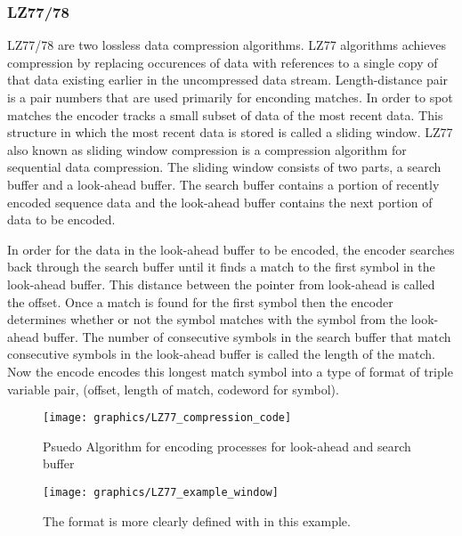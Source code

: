 \documentclass[letterpaper, 12pt]{article}
\begin{document}
\subsubsection{LZ77/78}
LZ77/78 are two lossless data compression algorithms. LZ77 algorithms achieves compression by replacing
occurences of data with references to a single copy of that data existing earlier in the uncompressed
data stream. Length-distance pair is a pair numbers that are used primarily for enconding matches. In order
to spot matches the encoder tracks a small subset of data of the most recent data. This structure in which
the most recent data is stored is called a sliding window. LZ77 also known as sliding window compression is
a compression algorithm for sequential data compression. The sliding window consists of two parts, a search
buffer and a look-ahead buffer. The search buffer contains a portion of recently encoded sequence data and
the look-ahead buffer contains the next portion of data to be encoded.
\par\vspace{\baselineskip}
In order for the data in the look-ahead buffer to be encoded, the encoder searches back through the
search buffer until it finds a match to the first symbol in the look-ahead buffer. This distance between
the pointer from look-ahead is called the offset. Once a match is found for the first symbol then the encoder
determines whether or not the symbol matches with the symbol from the look-ahead buffer. The number of
consecutive symbols in the search buffer that match consecutive symbols in the look-ahead buffer is called
the length of the match. Now the encode encodes this longest match symbol into a type of format of triple
variable pair, (offset, length of match, codeword for symbol).
\par\vspace{\baselineskip}
\begin{figure}
  \centering
  \texttt{[image: graphics/LZ77\_compression\_code]}
  \cite{LZ77_78}
  \caption{Psuedo Algorithm for encoding processes for look-ahead and search buffer}
\end{figure}

\begin{figure}
  \centering
  \texttt{[image: graphics/LZ77\_example\_window]}
  \cite{LZ77_78}
  \caption{The format is more clearly defined with in this example.}
\end{figure}
\newpage
\end{document}
